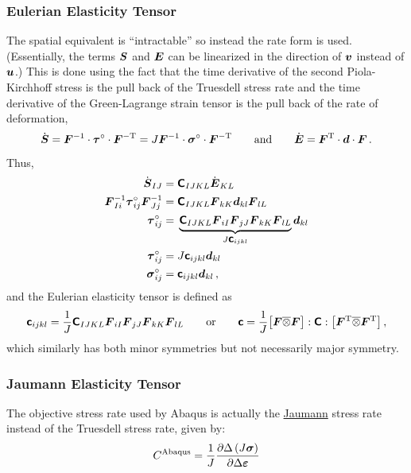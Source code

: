 \documentclass[10pt,letterpaper,oneside]{report}
\newcommand{\ten}[1]{\mbox{\boldmath $#1$}{}}
\newcommand{\tenf}[1]{\mbox{{\sffamily{\bfseries {#1}}}}}
\newcommand{\scas}[1]{\mbox{{\scriptsize{${\rm{#1}}$}}}{}}
\begin{document}
\subsubsection{Eulerian Elasticity Tensor}
The spatial equivalent is ``intractable'' so instead the rate form is used.  (Essentially, the terms $\ten{S}$ and $\ten{E}$ can be linearized in the direction of $\ten{v}$ instead of $\ten{u}$.)  This is done using the fact that the time derivative of the second Piola-Kirchhoff stress is the pull back of the Truesdell stress rate and the time derivative of the Green-Lagrange strain tensor is the pull back of the rate of deformation,
\begin{equation}
\dot{\ten{S}}  
= \ten{F}^{-1} \cdot \ten{ \tau }^{\circ} \cdot \ten{F}^{-\scas{T}} 
= J \ten{F}^{-1} \cdot \ten{ \sigma }^{\circ} \cdot \ten{F}^{-\scas{T}}
\qquad \mbox{and} \qquad 
\dot{\ten{E}} = \ten{F}^{\scas{T}} \cdot \ten{d} \cdot \ten{F} \, .
\end{equation}
Thus, 
\begin{align}
\dot{\ten{S}}_{IJ} ={}& \tenf{C}_{IJKL} \dot{\ten{E}}_{KL}
\\
\ten{F}^{-1}_{Ii} \ten{ \tau }^{\circ}_{ij} \ten{F}^{-1}_{Jj} ={}& \tenf{C}_{IJKL} \ten{F}_{kK} \ten{d}_{kl} \ten{F}_{lL}
\notag \\
\ten{ \tau }^{\circ}_{ij} ={}& \underbrace{ \tenf{C}_{IJKL} \ten{F}_{iI} \ten{F}_{jJ} \ten{F}_{kK} \ten{F}_{lL} }_{J \tenf{c}_{ijkl}}  \ten{d}_{kl}
\notag \\
\ten{ \tau }^{\circ}_{ij} ={}& J \tenf{c}_{ijkl} \ten{d}_{kl} 
\\
\ten{ \sigma }^{\circ}_{ij} ={}& \tenf{c}_{ijkl} \ten{d}_{kl} \, ,
\end{align}
and the Eulerian elasticity tensor is defined as
\begin{equation}
\tenf{c}_{ijkl} = \frac{1}{J} \tenf{C}_{IJKL} \ten{F}_{iI} \ten{F}_{jJ} \ten{F}_{kK} \ten{F}_{lL} 
\qquad \mbox{or} \qquad
\tenf{c}  = \frac{1}{J} \big[ \ten{F} \overline{\otimes} \ten{F} \big] : \tenf{C} : \big[ \ten{F}^{\scas{T}} \overline{\otimes} \ten{F}^{\scas{T}} \big] \, , 
\end{equation}
which similarly has both minor symmetries but not necessarily major symmetry.  


\subsubsection{Jaumann Elasticity Tensor}
The objective stress rate used by Abaqus is actually the \hyperlink{jaumann}{Jaumann} stress rate instead of the Truesdell stress rate, given by: 
\begin{equation}
{C}^{\scas{Abaqus}} = \frac{1}{J} \frac{\partial \Delta \left( J \ten{\sigma} \right)}{\partial \Delta \ten{\varepsilon}}
\end{equation}
\end{document}

